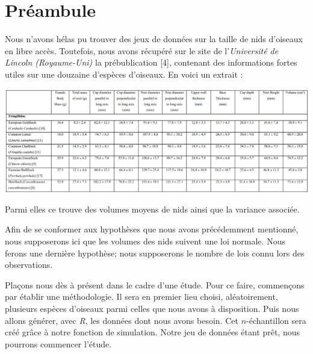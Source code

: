 \documentclass[frenchb]{report}
\newcommand{\1}{\mathbbm{1}}
\theoremstyle{definition}\newtheorem{defn}{Définition}
\theoremstyle{definition}\newtheorem{exm}{Exemple}
\theoremstyle{definition}\newtheorem{nota}{Notation}
\theoremstyle{definition}\newtheorem{rem}{Remarque}
\begin{document}
\section{Préambule}

Nous n'avons hélas pu trouver des jeux de données sur la taille de nids d'oiseaux en libre accès. Toutefois, nous avons récupéré sur le site de l'\textit{Université de Lincoln (Royaume-Uni)} la prébublication [4], contenant des informations fortes utiles sur une douzaine d'espèces d'oiseaux.
En voici un extrait :
\begin{center}
\includegraphics[scale = 0.5]{tab_oiseaux.png}
\end{center}

Parmi elles ce trouve des volumes moyens de nids ainsi que la variance associée. \newline


Afin de se conformer aux hypothèses que nous avons précédemment mentionné, nous supposerons ici que les volumes des nids suivent une loi normale. Nous ferons une dernière hypothèse; nous supposerons le nombre de lois connu lors des observations. \newline

Plaçons nous dès à présent dans le cadre d'une étude. Pour ce faire, commençons par établir une méthodologie. 
Il sera en premier lieu choisi, aléatoirement, plusieurs espèces d'oiseaux parmi celles que nous avons à disposition. Puis nous allons générer, avec \textit{R}, les données dont nous avons besoin. Cet $n$-échantillon sera créé grâce à notre fonction de simulation. Notre jeu de données étant prêt, nous pourrons commencer l'étude. \newline
\end{document}
